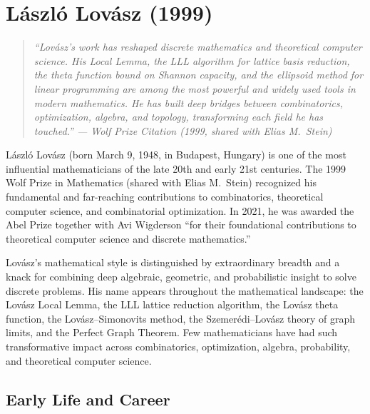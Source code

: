 \let\R\relax
\newcommand{\R}{\mathbb{R}}
\let\C\relax
\newcommand{\C}{\mathbb{C}}
\let\N\relax
\newcommand{\N}{\mathbb{N}}
\let\Z\relax
\newcommand{\Z}{\mathbb{Z}}
\let\Q\relax
\newcommand{\Q}{\mathbb{Q}}
\let\E\relax
\newcommand{\E}{\operatorname{E}}

\chapter{L\'{a}szl\'{o} Lov\'{a}sz (1999)}

\begin{quote}
\it ``Lov\'{a}sz's work has reshaped discrete mathematics and theoretical computer science. His Local Lemma, the LLL algorithm for lattice basis reduction, the theta function bound on Shannon capacity, and the ellipsoid method for linear programming are among the most powerful and widely used tools in modern mathematics. He has built deep bridges between combinatorics, optimization, algebra, and topology, transforming each field he has touched.'' --- Wolf Prize Citation (1999, shared with Elias M.\ Stein)
\end{quote}

L\'{a}szl\'{o} Lov\'{a}sz (born March 9, 1948, in Budapest, Hungary) is one of the most influential mathematicians of the late 20th and early 21st centuries. The 1999 Wolf Prize in Mathematics (shared with Elias M.\ Stein) recognized his fundamental and far-reaching contributions to combinatorics, theoretical computer science, and combinatorial optimization. In 2021, he was awarded the Abel Prize together with Avi Wigderson ``for their foundational contributions to theoretical computer science and discrete mathematics.''

Lov\'{a}sz's mathematical style is distinguished by extraordinary breadth and a knack for combining deep algebraic, geometric, and probabilistic insight to solve discrete problems. His name appears throughout the mathematical landscape: the Lov\'{a}sz Local Lemma, the LLL lattice reduction algorithm, the Lov\'{a}sz theta function, the Lov\'{a}sz--Simonovits method, the Szemer\'{e}di--Lov\'{a}sz theory of graph limits, and the Perfect Graph Theorem. Few mathematicians have had such transformative impact across combinatorics, optimization, algebra, probability, and theoretical computer science.

\section{Early Life and Career}

